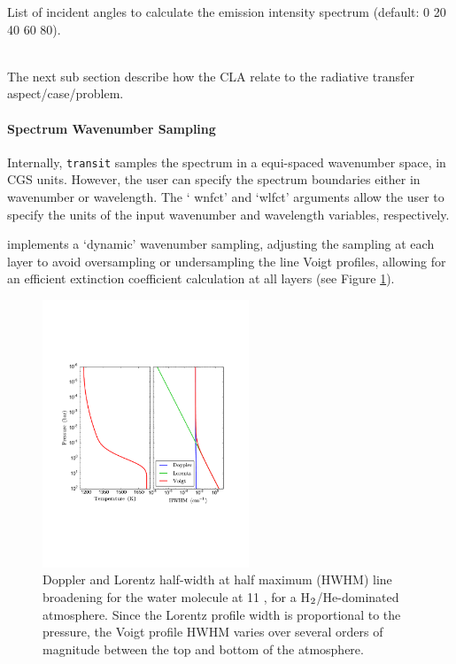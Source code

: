 \documentclass[letterpaper, 12pt]{article}
\begin{document}
 {List of incident angles to
  calculate the emission intensity spectrum (default: 0 20 40 60 80).}


 \\
The next sub section describe how the CLA relate to the radiative
transfer aspect/case/problem.

\paragraph{Spectrum Wavenumber Sampling}

Internally, {\tt transit} samples the spectrum in a equi-spaced
wavenumber space, in CGS units.  However, the user can specify the
spectrum boundaries either in wavenumber or wavelength.  The `{\tttb
  wnfct}' and `{\tttb wlfct}' arguments allow the user to specify the
units of the input wavenumber and wavelength variables, respectively.

{\transit} implements a `dynamic' wavenumber sampling, adjusting the
sampling at each layer to avoid oversampling or undersampling the line
Voigt profiles, allowing for an efficient extinction coefficient
calculation at all layers (see Figure \ref{fig:broadening}).

\begin{figure}[htb]
\centerline{
\includegraphics[width=0.55\textwidth, clip]{figs/widths.pdf}}
\caption{\small \label{fig:broadening} Doppler and Lorentz half-width
  at half maximum (HWHM) line broadening for the water molecule at 11
  {\microns}, for a H$\sb{2}$/He-dominated atmosphere.  Since the
  Lorentz profile width is proportional to the pressure, the Voigt
  profile HWHM varies over several orders of magnitude between the top
  and bottom of the atmosphere.}
\end{figure}
\end{document}
